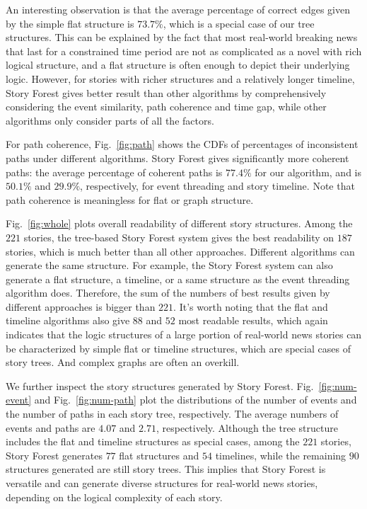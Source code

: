 An interesting observation is that the average percentage of correct edges given by the simple flat structure is $73.7\%$, which is a special case of our tree structures.
This can be explained by the fact that most real-world breaking news that last for a constrained time period are not as complicated as a novel with rich logical structure, and a flat structure is often enough to depict their underlying logic.
However, for stories with richer structures and a relatively longer timeline, Story Forest gives better result than other algorithms by comprehensively considering the event similarity, path coherence and time gap, while other algorithms only consider parts of all the factors. 


For path coherence, Fig.~\ref{fig:path} shows the CDFs of percentages of inconsistent paths under different algorithms.
Story Forest gives significantly more coherent paths: the average percentage of coherent paths is $77.4\%$ for our algorithm, and is $50.1\%$ and $29.9\%$, respectively, for event threading and story timeline. Note that path coherence is meaningless for flat or graph structure.

Fig.~\ref{fig:whole} plots overall readability of different story structures. Among the $221$ stories, the tree-based Story Forest system gives the best readability on $187$ stories, which is much better than all other approaches. Different algorithms can generate the same structure. For example, the Story Forest system can also generate a flat structure, a timeline, or a same structure as the event threading algorithm does. Therefore, the sum of the numbers of best results given by different approaches is bigger than $221$. It's worth noting that the flat and timeline algorithms also give $88$ and $52$ most readable results, which again indicates that the logic structures of a large portion of real-world news stories can be characterized by simple flat or timeline structures, which are special cases of story trees. And complex graphs are often an overkill. 

We further inspect the story structures generated by Story Forest. Fig.~\ref{fig:num-event} and Fig.~\ref{fig:num-path} plot the distributions of the number of events and the number of paths in each story tree, respectively. The average numbers of events and paths are $4.07$ and $2.71$, respectively. Although the tree structure includes the flat and timeline structures as special cases, among the $221$ stories, Story Forest generates $77$ flat structures and $54$ timelines, while the remaining $90$ structures generated are still story trees. This implies that Story Forest is versatile and can generate diverse structures for real-world news stories, depending on the logical complexity of each story. 


